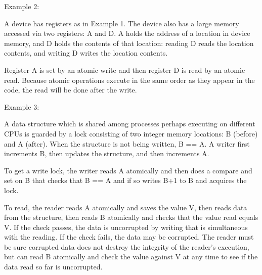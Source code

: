 \documentclass[12pt]{article}
\newenvironment{indpar}[1][0.3in]%
	{\begin{list}{}%
		     {\setlength{\itemsep}{0in}%
		      \setlength{\topsep}{0in}%
		      \setlength{\parsep}{1ex}%
		      \setlength{\labelwidth}{#1}%
		      \setlength{\leftmargin}{#1}%
		      \addtolength{\leftmargin}{\labelsep}}%
	 \item}%
	{\end{list}}
\begin{document}
Example 2:
\begin{indpar}
A device has registers as in Example 1.  The device also has a large
memory accessed via two registers: A and D.  A holds the address of
a location in device memory, and D holds the contents of that location:
reading D reads the location contents, and writing D writes the location
contents.

Register A is set by an atomic write and then register D
is read by an atomic read.  Because atomic operations execute in the
same order as they appear in the code, the read will be done after the
write.
\end{indpar}

Example 3:
\begin{indpar}
A data structure which is shared among processes perhaps executing
on different CPUs is guarded by a lock consisting of two integer
memory locations: B (before) and A (after).  When the structure is
not being written, B == A.  A writer first increments B, then
updates the structure, and then increments A.

To get a write lock, the writer reads A atomically and then does
a compare and set on B that checks that B == A and if so writes
B+1 to B and acquires the lock.

To read, the reader reads A atomically and saves the value V,
then reads data from the structure, then reads B atomically and
checks that the value read equals V.  If the check passes, the data
is uncorrupted by writing that is simultaneous with the reading.
If the check fails, the data may be corrupted.  The reader must be
sure corrupted data does not destroy the integrity of the reader's execution,
but can read B atomically and check the value against V
at any time to see if the data read so far is uncorrupted.
\end{indpar}

	
\end{document}
